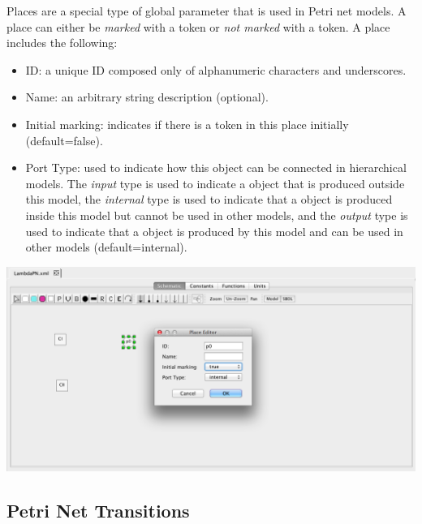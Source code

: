 \documentclass[titlepage,11pt]{article}
\begin{document}
\noindent
Places are a special type of global parameter that is used in Petri net models.  A place can either be \emph{marked} with a token or \emph{not marked} with a token.  A place includes the following:
\begin{itemize}
\item ID: a unique ID composed only of alphanumeric characters and underscores.
\item Name: an arbitrary string description (optional).
\item Initial marking: indicates if there is a token in this place initially (default=false).
\item Port Type: used to indicate how this object can be connected in hierarchical models.  The \emph{input} type is used to indicate a object that is produced outside this model, the \emph{internal} type is used to indicate that a object is produced inside this model but cannot be used in other models, and the \emph{output} type is used to indicate that a object is produced by this model and can be used in other models (default=internal). 
\end{itemize}

\begin{center}
\includegraphics[width=160mm]{screenshots/place}
\end{center}

\clearpage

\subsection{\label{Transitions}Petri Net Transitions}
\end{document}
